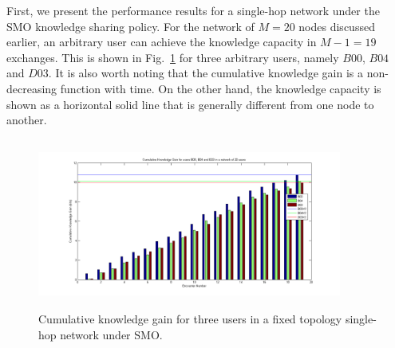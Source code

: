 \documentclass[conference]{IEEEtran}
\theoremstyle{definition}
\begin{document}
First, we present the performance results for a single-hop network under the 
SMO knowledge sharing policy. For the network of $M=20$ nodes discussed earlier, an 
arbitrary user can achieve the knowledge capacity in $M-1=19$ exchanges. This is shown in Fig.~\ref{fig:B00_SSHOP)} for three arbitrary users, namely $B00$, $B04$ and $D03$. It is also worth noting that the cumulative knowledge gain is a non-decreasing function with time. On the other hand, the knowledge capacity is shown as a horizontal solid line that is generally different from one node to another.
%
\begin{figure}[!tp]
\centering
    \includegraphics[width=10cm ,height=5.6cm]{figures_png/Fig5}
    \caption{Cumulative knowledge gain for three users in a fixed topology single-hop network under SMO.}\label{fig:B00_SSHOP)}
\end{figure}
%
\end{document}

